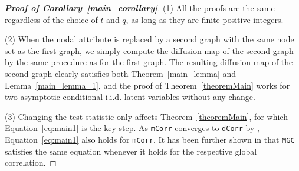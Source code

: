 \documentclass[11pt]{article}
\theoremstyle{definition}
\begin{document}
\begin{proof}[\textbf{Proof of Corollary~\ref{main_corollary}}] 
(1) All the proofs are the same regardless of the choice of $t$ and $q$, as long as they are finite positive integers.

(2) When the nodal attribute is replaced by a second graph with the same node set as the first graph, we simply compute the diffusion map of the second graph by the same procedure as for the first graph. The resulting diffusion map of the second graph clearly satisfies both Theorem~\ref{main_lemma} and Lemma~\ref{main_lemma_1}, and the proof of Theorem~\ref{theoremMain} works for two asymptotic conditional i.i.d. latent variables without any change.

(3) Changing the test statistic only affects Theorem~\ref{theoremMain}, for which Equation~\ref{eq:main1} is the key step. As \texttt{mCorr} converges to \texttt{dCorr} by \cite{szekely2013distance}, Equation~\ref{eq:main1} also holds for \texttt{mCorr}. It has been further shown in \cite{shen2016discovering} that \texttt{MGC} satisfies the same equation whenever it holds for the respective global correlation. 
\end{proof}
\end{document}

